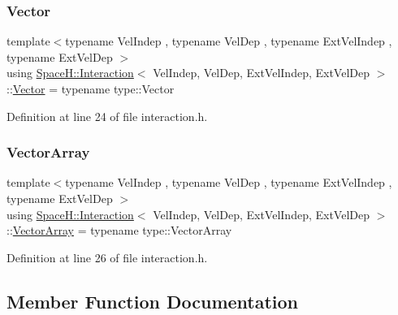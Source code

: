 \subsubsection{\texorpdfstring{Vector}{Vector}}
{\footnotesize\ttfamily template$<$typename Vel\+Indep , typename Vel\+Dep , typename Ext\+Vel\+Indep , typename Ext\+Vel\+Dep $>$ \\
using \mbox{\hyperlink{class_space_h_1_1_interaction}{Space\+H\+::\+Interaction}}$<$ Vel\+Indep, Vel\+Dep, Ext\+Vel\+Indep, Ext\+Vel\+Dep $>$\+::\mbox{\hyperlink{class_space_h_1_1_interaction_ad6d656d30b9272a5f690b0412a4a9a86}{Vector}} =  typename type\+::\+Vector}



Definition at line 24 of file interaction.\+h.

\mbox{\label{class_space_h_1_1_interaction_a9aaccf9a34d875881d9448acf7aaf009}} 
\subsubsection{\texorpdfstring{Vector\+Array}{VectorArray}}
{\footnotesize\ttfamily template$<$typename Vel\+Indep , typename Vel\+Dep , typename Ext\+Vel\+Indep , typename Ext\+Vel\+Dep $>$ \\
using \mbox{\hyperlink{class_space_h_1_1_interaction}{Space\+H\+::\+Interaction}}$<$ Vel\+Indep, Vel\+Dep, Ext\+Vel\+Indep, Ext\+Vel\+Dep $>$\+::\mbox{\hyperlink{class_space_h_1_1_interaction_a9aaccf9a34d875881d9448acf7aaf009}{Vector\+Array}} =  typename type\+::\+Vector\+Array}



Definition at line 26 of file interaction.\+h.



\subsection{Member Function Documentation}
\mbox{\label{class_space_h_1_1_interaction_ae5763f03d500bc392c44d48cf87fe6fb}} 
